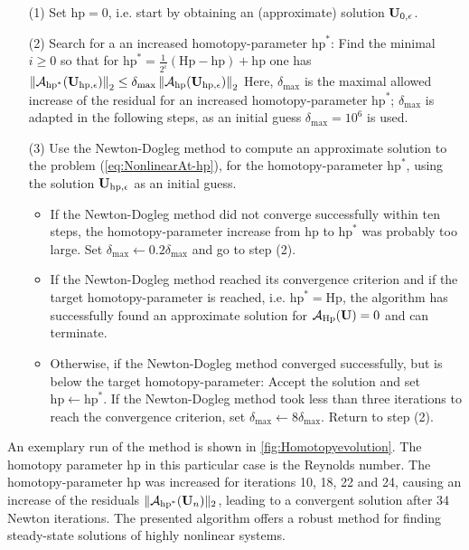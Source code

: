 \begin{itemize}
	\item[(1)]
	Set $\mathrm{hp} = 0$, i.e. start by obtaining an (approximate) solution $\textbf{U}_{0,\epsilon}$.
	
	\item[(2)]
	Search for a an increased homotopy-parameter $\mathrm{hp}^*$:
	Find the minimal $i \geq 0$ so that for
	$
	\mathrm{hp}^* = \frac{1}{2^i}(\mathrm{Hp} - \mathrm{hp}) + \mathrm{hp}
	$
	one has
	$
	\left\| \mathcal{A}_{\mathrm{hp}^*}(\textbf{U}_{\mathrm{hp},\epsilon}) \right\|_2
	\leq
	\delta_{\textrm{max}} \left\| \mathcal{A}_{\mathrm{hp}}(\textbf{U}_{\mathrm{hp},\epsilon}) \right\|_2
	$
	Here, $\delta_{\textrm{max}}$ is the maximal allowed increase of the residual for an increased
	homotopy-parameter $\mathrm{hp}^*$;  $\delta_{\textrm{max}}$ is adapted in the following steps,
	as an initial guess $ \delta_{\textrm{max}} = 10^6$ is used.
	
	\item[(3)]
	Use the Newton-Dogleg method to compute an approximate solution to the problem (\ref{eq:NonlinearAt-hp}),
	for the homotopy-parameter $\mathrm{hp}^*$,
	using the solution $\textbf{U}_{\mathrm{hp},\epsilon}$ as an initial guess.
	
	\begin{itemize}
		\item
		If the Newton-Dogleg method did not converge successfully within ten steps,
		the homotopy-parameter increase from $\mathrm{hp}$ to $\mathrm{hp}^*$ was probably too large.
		Set $\delta_{\textrm{max}} \leftarrow 0.2\delta_{\textrm{max}}$ and go to step (2).
		
		\item
		If the Newton-Dogleg method reached its convergence criterion and
		if the target homotopy-parameter is reached, i.e. $\mathrm{hp}^* = \mathrm{Hp}$,
		the algorithm has successfully found an approximate solution
		for $ \mathcal{A}_{\mathrm{Hp}}(\textbf{U}) = 0$ and can terminate.
		
		\item
		Otherwise, if the Newton-Dogleg method converged successfully, but is below the target homotopy-parameter:
		Accept the solution and set $\mathrm{hp} \leftarrow \mathrm{hp}^*$.
		If the Newton-Dogleg method took less than three iterations to reach the convergence criterion,
		set  $\delta_{\textrm{max}} \leftarrow 8\delta_{\textrm{max}}$.
		Return to step (2).
	\end{itemize}	
\end{itemize}%
%
An exemplary run of the method is shown in \cref{fig:Homotopyevolution}. The homotopy parameter $\mathrm{hp}$ in this particular case is the Reynolds number. The homotopy-parameter hp was increased for iterations 10, 18, 22 and 24, causing an increase of the residuals $\| \mathcal{A}_{\mathrm{hp}^*}(\textbf{U}_{n}) \|_2 $, leading to a convergent solution after 34 Newton iterations. The presented algorithm offers a robust method for finding steady-state solutions of highly nonlinear systems.

